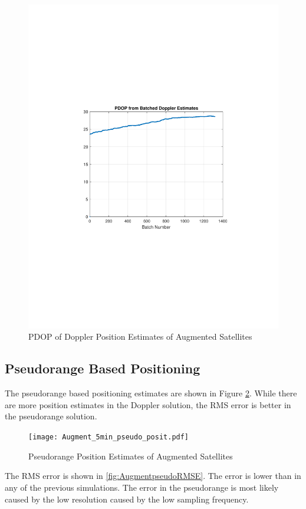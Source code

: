 \documentclass[12pt]{report}
\begin{document}
\begin{figure}[h!]
    \centering
    \includegraphics[trim=1.2in 3.3in 1.75in 3.3in,clip,width=5in]
    {Augment_5min_Doppler_PDOP.pdf}
    \caption{PDOP of Doppler Position Estimates of Augmented Satellites}
    \label{fig:AugmentdopplerPDOP}
\end{figure}

\pagebreak
\subsection{Pseudorange Based Positioning}
The pseudorange based positioning estimates are shown in Figure \ref{fig:Augmentpseudoposit}. While there are more position estimates in the Doppler solution, the RMS error is better in the pseudorange solution.
\begin{figure}[h!]
    \centering
    \texttt{[image: Augment\_5min\_pseudo\_posit.pdf]}
    \caption{Pseudorange Position Estimates of Augmented Satellites}
    \label{fig:Augmentpseudoposit}
\end{figure}
The RMS error is shown in \ref{fig:AugmentpseudoRMSE}. The error is lower than in any of the previous simulations. The error in the pseudorange is most likely caused by the low resolution caused by the low sampling frequency. 
\end{document}

